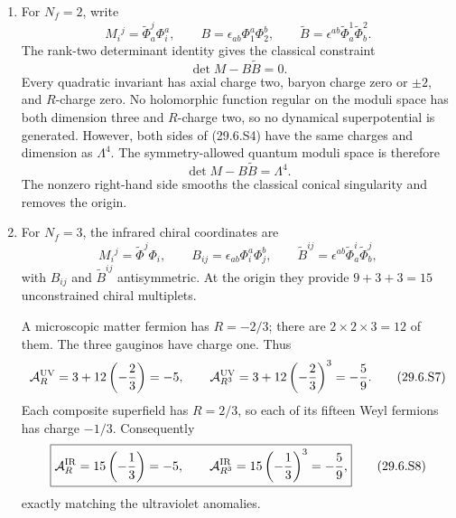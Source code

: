\begin{enumerate}
\begin{enumerate}
    \item For \(N_f=2\), write
    \[
      M_i{}^j=\widetilde\Phi^j_a\Phi_i^a,
      \qquad
      B=\epsilon_{ab}\Phi_1^a\Phi_2^b,
      \qquad
      \widetilde B=\epsilon^{ab}\widetilde\Phi^1_a
        \widetilde\Phi^2_b.
      \tag{29.6.S3}
    \]
    The rank-two determinant identity gives the classical constraint
    \[
      \det M-B\widetilde B=0.
      \tag{29.6.S4}
    \]
    Every quadratic invariant has axial charge two, baryon charge zero or
    \(\pm2\), and \(R\)-charge zero.  No holomorphic function regular on
    the moduli space has both dimension three and \(R\)-charge two, so no
    dynamical superpotential is generated.  However, both sides of
    (29.6.S4) have the same charges and dimension as \(\Lambda^4\).
    The symmetry-allowed quantum moduli space is therefore
    \[
      \boxed{\det M-B\widetilde B=\Lambda^4.}
      \tag{29.6.S5}
    \]
    The nonzero right-hand side smooths the classical conical singularity
    and removes the origin.

    \item For \(N_f=3\), the infrared chiral coordinates are
    \[
      M_i{}^j=\widetilde\Phi^j\Phi_i,
      \qquad
      B_{ij}=\epsilon_{ab}\Phi_i^a\Phi_j^b,
      \qquad
      \widetilde B^{ij}=\epsilon^{ab}\widetilde\Phi^i_a
        \widetilde\Phi^j_b,
      \tag{29.6.S6}
    \]
    with \(B_{ij}\) and \(\widetilde B^{ij}\) antisymmetric.  At the
    origin they provide \(9+3+3=15\) unconstrained chiral multiplets.

    A microscopic matter fermion has \(R=-2/3\); there are
    \(2\times2\times3=12\) of them.  The three gauginos have charge one.
    Thus
    \[
      \mathcal A_R^{\rm UV}=3+12\left(-\frac23\right)=-5,
      \qquad
      \mathcal A_{R^3}^{\rm UV}
       =3+12\left(-\frac23\right)^3=-\frac59.
      \tag{29.6.S7}
    \]
    Each composite superfield has \(R=2/3\), so each of its fifteen Weyl
    fermions has charge \(-1/3\).  Consequently
    \[
      \boxed{
      \mathcal A_R^{\rm IR}=15\left(-\frac13\right)=-5,
      \qquad
      \mathcal A_{R^3}^{\rm IR}
       =15\left(-\frac13\right)^3=-\frac59,}
      \tag{29.6.S8}
    \]
    exactly matching the ultraviolet anomalies.
  \end{enumerate}


\end{enumerate}
